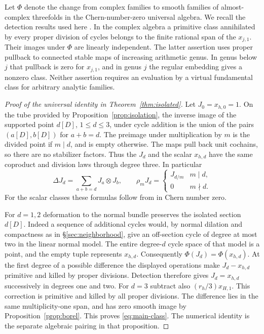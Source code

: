 Let $\Phi$ denote the change from complex families to smooth families
of almost-complex threefolds in the Chern-number-zero universal
algebra. We recall the detection results used here
\cite[\S\S5--7]{WueProduct}. In the complex algebra a primitive class
annihilated by every proper division of cycles belongs to the finite
rational span of the $x_{j,1}$. Their images under $\Phi$ are linearly
independent. The latter assertion uses proper pullback to connected
stable maps of increasing arithmetic genus. In genus below $j$ that
pullback is zero for $x_{j,1}$, and in genus $j$ the regular embedding
gives a nonzero class. Neither assertion requires an evaluation by a
virtual fundamental class for arbitrary analytic families.

\begin{proof}[Proof of the universal identity in Theorem~\ref{thm:isolated}]
Let $J_0=x_{h,0}=1$. On the tube provided by
Proposition~\ref{prop:isolation}, the inverse image of the supported
point $d[D]$, $1\le d\le3$, under cycle addition is the union of the
pairs $(a[D],b[D])$ for $a+b=d$. The preimage under multiplication
by $m$ is the divided point if $m\mid d$, and is empty otherwise.
The maps pull back unit cochains, so there are no stabilizer factors.
Thus the $J_d$ and the scalar $x_{h,d}$ have the same coproduct and
division laws through degree three. In particular
\[
 \Delta J_d=\sum_{a+b=d}J_a\otimes J_b,\qquad
 \rho_m J_d=
 \begin{cases}
 J_{d/m}&m\mid d,\\
 0&m\nmid d .
 \end{cases}
\]
For the scalar classes these formulas follow from
\cite[\S4]{Pardon} in Chern number zero.

For $d=1,2$ deformation to the normal bundle preserves the isolated
section $d[D]$. Indeed a sequence of additional cycles would, by normal
dilation and compactness as in \S\ref{sec:neighborhood}, give an
off-section cycle of degree at most two in the linear normal model.
The entire degree-$d$ cycle space of that model is a point, and the
empty tuple represents $x_{h,d}$. Consequently
$\Phi(J_d)=\Phi(x_{h,d})$. At the first degree of a possible difference
the displayed operations make $J_d-x_{h,d}$ primitive and killed by
proper divisions. Detection therefore gives $J_d=x_{h,d}$ successively
in degrees one and two. For $d=3$ subtract also $(r_h/3)x_{H,1}$.
This correction is primitive and killed by all proper divisions.
The difference lies in the same multiplicity-one span, and has zero
smooth image by Proposition~\ref{prop:borel}. This proves
\eqref{eq:main-class}. The numerical identity is the separate
algebraic pairing in that proposition.
\end{proof}


